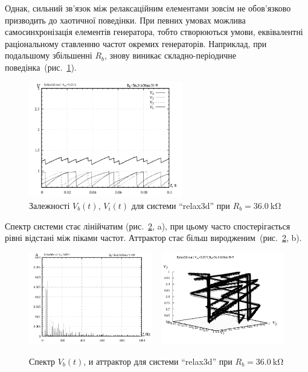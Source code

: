 Однак, сильний зв'язок між релаксаційним елементами зовсім не
обов'язково призводить до хаотичної поведінки. При певних
умовах можлива самосинхронізація елементів генератора, тобто
створюються умови, еквівалентні раціональному ставленню частот
окремих генераторів. Наприклад, при подальшому збільшенні
$R_b$, знову виникає складно-періодичне
поведінка~(рис.~\ref{atu:f:relax3d_t_09}).

\begin{figure}[htb!]
  \centerline{\includegraphics[width=0.6\textwidth]{p/relax3d_t_09.png} }
\caption{Залежності $ V_b (t) $, $ V_i (t) $ для системи ``relax3d'' при $ R_b = \SI{36.0}{\kilo\ohm} $}
\label{atu:f:relax3d_t_09}
\end{figure}

Спектр системи стає лінійчатим (рис.~\ref{atu:f:relax3d_f_09}, a), при
цьому часто спостерігається рівні відстані між піками
частот. Аттрактор стає більш виродженим~(рис.~\ref{atu:f:relax3d_f_09}, b).

\begin{figure}[htb!]
  \centerline{
    \includegraphics[width=0.48\textwidth]{p/relax3d_f_09.png}
    ~
    \includegraphics[width=0.48\textwidth]{p/relax3d_v1v2v3_09.png}
  }
  \caption{Спектр $V_b(t)$, и аттрактор для системи ``relax3d'' при $R_b=\SI{36.0}{\kilo\ohm}$ }
  \label{atu:f:relax3d_f_09}
\end{figure}

